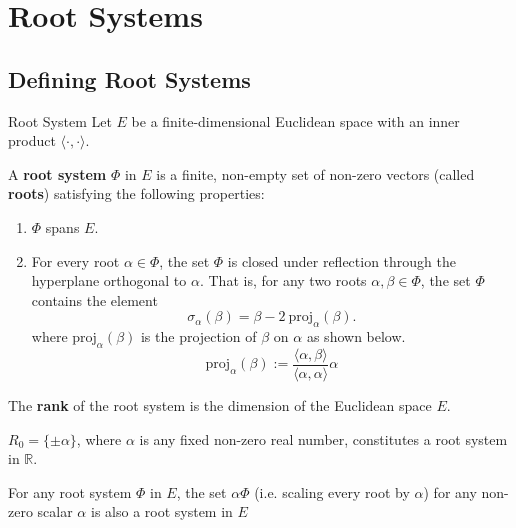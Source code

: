 \chapter{Root Systems}
\section{Defining Root Systems}

\begin{nameddefinition}{Root System}
    Let $E$ be a finite-dimensional Euclidean space with an inner product $\langle \cdot, \cdot \rangle$. \newline
    
    A \textbf{root system} $\Phi$ in $E$ is a finite, non-empty set of non-zero vectors (called
    \textbf{roots}) satisfying the following properties:
    
    \begin{enumerate}[label=(R{\arabic*})]
        \item $\Phi$ spans $E$.
        \item For every root $\alpha \in \Phi$, the set $\Phi$ is closed under reflection through the hyperplane orthogonal to $\alpha$.
        That is, for any two roots $\alpha, \beta \in \Phi$, the set $\Phi$ contains the element
        \begin{equation*}
            \sigma_\alpha(\beta) = \beta - 2 \ \text{proj}_{\alpha}(\beta).
        \end{equation*}
        where $\text{proj}_{\alpha}(\beta)$ is the projection of $\beta$ on $\alpha$ as shown below.
        \begin{equation*}
            \text{proj}_{\alpha}(\beta) := \frac{ \langle \alpha, \beta \rangle}{\langle \alpha, \alpha \rangle} \alpha
        \end{equation*}
    \end{enumerate}

    The \textbf{rank} of the root system is the dimension of the Euclidean space $E$.
\end{nameddefinition}

\begin{example}
    $R_0 = \{\pm \alpha\}$, where $\alpha$ is any fixed non-zero real number, constitutes a root system in $\mathbb{R}$.
\end{example}

\begin{example}
    For any root system $\Phi$ in $E$, the set $\alpha\Phi$ (i.e. scaling every root by 
    $\alpha$) for any non-zero scalar $\alpha$ is also a root system in $E$
\end{example}

